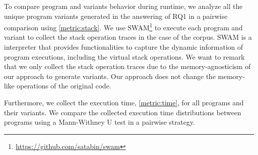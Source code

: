 To compare program and variants behavior during runtime, we analyze all the unique program variants generated in the answering of RQ1 in a pairwise comparison using \autoref{metric:stack}. We use SWAM\footnote{\url{https://github.com/satabin/swam}} to execute each program and variant to collect the stack operation traces in the case of the \corpusrosetta corpus. SWAM is a \wasm interpreter that provides functionalities to capture the dynamic information of \wasm program executions, including the virtual stack operations. We want to remark that we only collect the stack operation traces due to the memory-agnosticism of our approach to generate variants. Our approach does not change the memory-like operations of the original code.

Furthermore, we collect the execution time, \autoref{metric:time}, for all programs and their variants. We compare the collected execution time distributions between programs using a Mann-Withney U test \cite{mann1947} in a pairwise strategy.


 